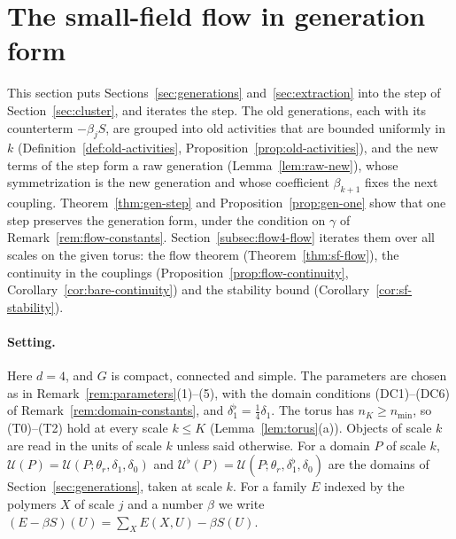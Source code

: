 \section{The small-field flow in generation form}\label{sec:flow4}

This section puts Sections~\ref{sec:generations} and~\ref{sec:extraction} into the step of Section~\ref{sec:cluster}, and iterates the step. The old generations, each with its counterterm $-\beta_jS$, are grouped into old activities that are bounded uniformly in $k$ (Definition~\ref{def:old-activities}, Proposition~\ref{prop:old-activities}), and the new terms of the step form a raw generation (Lemma~\ref{lem:raw-new}), whose symmetrization is the new generation and whose coefficient $\beta_{k+1}$ fixes the next coupling. Theorem~\ref{thm:gen-step} and Proposition~\ref{prop:gen-one} show that one step preserves the generation form, under the condition on $\gamma$ of Remark~\ref{rem:flow-constants}. Section~\ref{subsec:flow4-flow} iterates them over all scales on the given torus: the flow theorem (Theorem~\ref{thm:sf-flow}), the continuity in the couplings (Proposition~\ref{prop:flow-continuity}, Corollary~\ref{cor:bare-continuity}) and the stability bound (Corollary~\ref{cor:sf-stability}).

\paragraph{Setting.} Here $d=4$, and $G$ is compact, connected and simple. The parameters are chosen as in Remark~\ref{rem:parameters}(1)--(5), with the domain conditions (DC1)--(DC6) of Remark~\ref{rem:domain-constants}, and $\delta_1^\flat=\frac14\delta_1$. The torus has $n_K\ge n_{\min}$, so (T0)--(T2) hold at every scale $k\le K$ (Lemma~\ref{lem:torus}(a)). Objects of scale $k$ are read in the units of scale $k$ unless said otherwise. For a domain $P$ of scale $k$, $\mathcal U(P)=\mathcal U(P;\theta_r,\delta_1,\delta_0)$ and $\mathcal U^\flat(P)=\mathcal U(P;\theta_r,\delta_1^\flat,\delta_0)$ are the domains of Section~\ref{sec:generations}, taken at scale $k$. For a family $E$ indexed by the polymers $X$ of scale $j$ and a number $\beta$ we write $(E-\beta S)(U)=\sum_XE(X,U)-\beta S(U)$.

